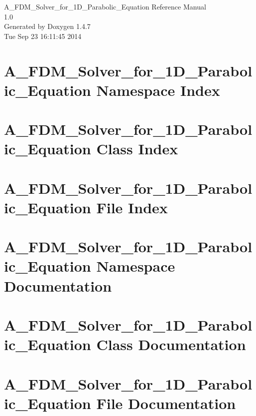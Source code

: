 \documentclass[a4paper]{book}
\begin{document}
\begin{titlepage}
\vspace*{7cm}
\begin{center}
{\Large A\_\-FDM\_\-Solver\_\-for\_\-1D\_\-Parabolic\_\-Equation Reference Manual\\[1ex]\large 1.0 }\\
\vspace*{1cm}
{\large Generated by Doxygen 1.4.7}\\
\vspace*{0.5cm}
{\small Tue Sep 23 16:11:45 2014}\\
\end{center}
\end{titlepage}
\clearemptydoublepage
{}
\tableofcontents
\clearemptydoublepage
{}
\chapter{A\_\-FDM\_\-Solver\_\-for\_\-1D\_\-Parabolic\_\-Equation Namespace Index}

\chapter{A\_\-FDM\_\-Solver\_\-for\_\-1D\_\-Parabolic\_\-Equation Class Index}

\chapter{A\_\-FDM\_\-Solver\_\-for\_\-1D\_\-Parabolic\_\-Equation File Index}

\chapter{A\_\-FDM\_\-Solver\_\-for\_\-1D\_\-Parabolic\_\-Equation Namespace Documentation}

\chapter{A\_\-FDM\_\-Solver\_\-for\_\-1D\_\-Parabolic\_\-Equation Class Documentation}

\chapter{A\_\-FDM\_\-Solver\_\-for\_\-1D\_\-Parabolic\_\-Equation File Documentation}



\printindex
\end{document}

